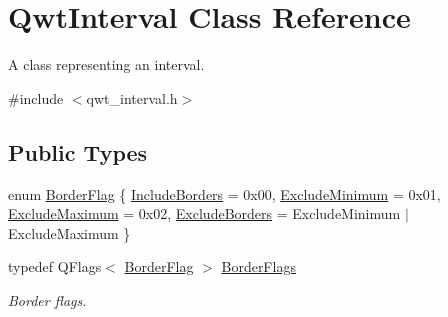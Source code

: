 \hypertarget{class_qwt_interval}{\section{Qwt\-Interval Class Reference}
\label{class_qwt_interval}
}


A class representing an interval.  




{\ttfamily \#include $<$qwt\-\_\-interval.\-h$>$}

\subsection*{Public Types}
\begin{DoxyCompactItemize}
\item 
enum \hyperlink{class_qwt_interval_a3a4b4e49495108c660fc07a62af7ac54}{Border\-Flag} \{ \hyperlink{class_qwt_interval_a3a4b4e49495108c660fc07a62af7ac54ad8a550b5eb1062cd84bcba22c60e5e60}{Include\-Borders} = 0x00, 
\hyperlink{class_qwt_interval_a3a4b4e49495108c660fc07a62af7ac54aa7fde04c41d882187bb13f0104da7240}{Exclude\-Minimum} = 0x01, 
\hyperlink{class_qwt_interval_a3a4b4e49495108c660fc07a62af7ac54a70e70e65956ae319e507bc38b792c434}{Exclude\-Maximum} = 0x02, 
\hyperlink{class_qwt_interval_a3a4b4e49495108c660fc07a62af7ac54afc7d2a399b311a1cc8026681410fc22c}{Exclude\-Borders} = Exclude\-Minimum $|$ Exclude\-Maximum
 \}
\item 
typedef Q\-Flags$<$ \hyperlink{class_qwt_interval_a3a4b4e49495108c660fc07a62af7ac54}{Border\-Flag} $>$ \hyperlink{class_qwt_interval_a678a26fcaa91cca596d9aebcbf5776c9}{Border\-Flags}
\begin{DoxyCompactList}\small\item\em Border flags. \end{DoxyCompactList}\end{DoxyCompactItemize}
